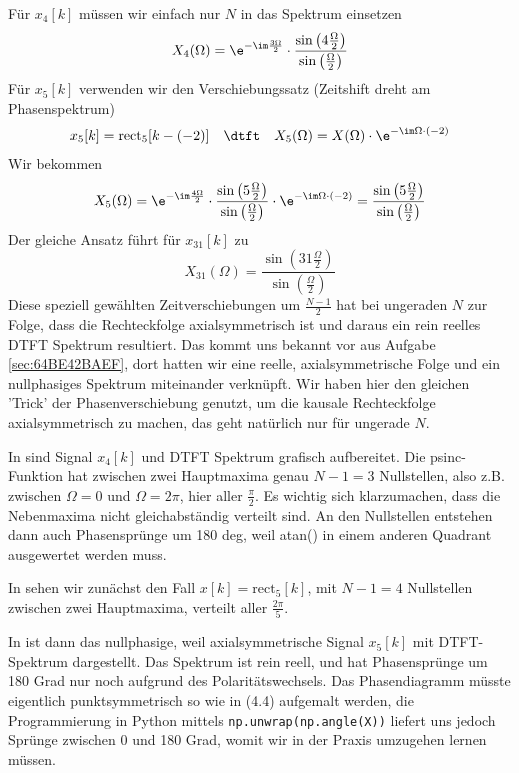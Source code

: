 \begin{Loesung}
Für $x_4[k]$ müssen wir einfach nur $N$ in das Spektrum einsetzen
\begin{equation}
X_4(\Omega)=\e^{-\im\frac{3\Omega}{2}}\cdot\frac{\sin\left(4\frac{\Omega}{2}\right)}{\sin\left(\frac{\Omega}{2}\right)}
\end{equation}
%
Für $x_5[k]$ verwenden wir den Verschiebungssatz (Zeitshift dreht am Phasenspektrum)
\begin{align}
x_5[k] = \mathrm{rect}_5[k-(-2)] \quad\dtft\quad X_5(\Omega) = X(\Omega) \cdot \e^{-\im\Omega\cdot (-2)}
\end{align}
Wir bekommen
\begin{equation}
X_5(\Omega)
=\e^{-\im\frac{4\Omega}{2}}\cdot\frac{\sin\left(5\frac{\Omega}{2}\right)}{\sin\left(\frac{\Omega}{2}\right)}  \cdot \e^{-\im\Omega\cdot (-2)}=
\frac{\sin\left(5\frac{\Omega}{2}\right)}{\sin\left(\frac{\Omega}{2}\right)}
\end{equation}
Der gleiche Ansatz führt für $x_{31}[k]$ zu
\begin{equation}
X_{31}(\Omega) = \frac{\sin\left(31\frac{\Omega}{2}\right)}{\sin\left(\frac{\Omega}{2}\right)}
\end{equation}
%
Diese speziell gewählten Zeitverschiebungen um $\frac{N-1}{2}$ hat bei ungeraden
$N$ zur Folge, dass die Rechteckfolge axialsymmetrisch ist und daraus
ein rein reelles DTFT Spektrum resultiert. Das kommt uns bekannt vor aus
Aufgabe \ref{sec:64BE42BAEF}, dort hatten wir
eine reelle, axialsymmetrische Folge und ein nullphasiges Spektrum miteinander
verknüpft. Wir haben hier den gleichen 'Trick' der Phasenverschiebung genutzt,
um die kausale Rechteckfolge axialsymmetrisch zu machen, das geht natürlich
nur für ungerade $N$.
%

In  sind Signal $x_4[k]$ und DTFT
Spektrum grafisch aufbereitet. Die psinc-Funktion hat zwischen zwei Hauptmaxima
genau $N-1=3$ Nullstellen, also z.B. zwischen $\Omega=0$ und $\Omega=2\pi$,
hier aller $\frac{\pi}{2}$. Es wichtig sich klarzumachen, dass die Nebenmaxima
nicht gleichabständig verteilt sind.
%
An den Nullstellen entstehen dann auch Phasensprünge um 180 deg, weil
atan() in einem anderen Quadrant ausgewertet werden muss.

In  sehen wir zunächst den Fall
$x[k] = \mathrm{rect}_5[k]$, mit $N-1=4$ Nullstellen zwischen zwei Hauptmaxima,
verteilt aller $\frac{2\pi}{5}$.

In  ist dann das nullphasige, weil axialsymmetrische
Signal $x_5[k]$ mit DTFT-Spektrum dargestellt.
Das Spektrum ist rein reell, und hat Phasensprünge um 180 Grad nur
noch aufgrund des Polaritätswechsels. Das Phasendiagramm müsste eigentlich
punktsymmetrisch so wie in  (4.4)
aufgemalt werden, die Programmierung in Python
mittels \texttt{np.unwrap(np.angle(X))} liefert uns jedoch Sprünge zwischen 0 und 180 Grad,
womit wir in der Praxis umzugehen lernen müssen.


\end{Loesung}
